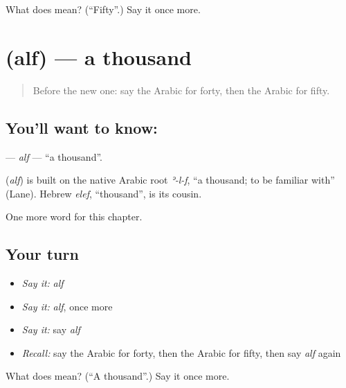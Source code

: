 \begin{tcolorbox}[breakable,colback=teal!4,colframe=teal!35!black,title={Before you move on}]
What does  mean? (\textquotedblleft{}Fifty\textquotedblright{}.) Say it once more.
\end{tcolorbox}
\section[\texorpdfstring{\ar{ألف} (alf)}{ألف (alf)}]{ (alf) — a thousand}

\label{lesson:AR-C97-alf}



\begin{quote}
Before the new one: say the Arabic for forty, then the Arabic for fifty.
\end{quote}

\subsection*{You'll want to know: }
\textbf{} — \emph{alf} — \textquotedblleft{}a thousand\textquotedblright{}.

\begin{cousinweb}
\textbf{} (\emph{alf}) is built on the native Arabic root \emph{ʾ-l-f}, \textquotedblleft{}a thousand; to be familiar with\textquotedblright{} (Lane). Hebrew \emph{elef}, \textquotedblleft{}thousand\textquotedblright{}, is its cousin.
\end{cousinweb}

\begin{grammarlens}[title={What you've built}]
One more word for this chapter.
\end{grammarlens}

\subsection*{Your turn}
\begin{itemize}
\raggedright
  \item \emph{Say it:} \emph{alf}
  \item \emph{Say it:} \emph{alf}, once more
  \item \emph{Say it:} say \emph{alf}
  \item \emph{Recall:} say the Arabic for forty, then the Arabic for fifty, then say \emph{alf} again
\end{itemize}

\begin{tcolorbox}[breakable,colback=teal!4,colframe=teal!35!black,title={Before you move on}]
What does  mean? (\textquotedblleft{}A thousand\textquotedblright{}.) Say it once more.
\end{tcolorbox}
